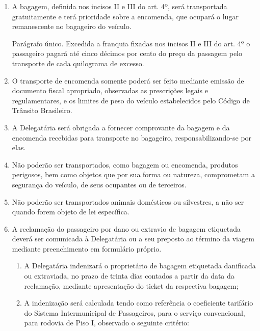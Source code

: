 \begin{enumerate}[resume, label=Art. \arabic*]

\item A bagagem, definida nos incisos II e III do art. 4º, será transportada gratuitamente e terá prioridade sobre a encomenda, que ocupará o lugar remanescente no bagageiro do veículo.

Parágrafo único. Excedida a franquia fixadas nos incisos II e III do art. 4º o passageiro pagará até cinco décimos por cento do preço da passagem pelo transporte de cada quilograma de excesso.

\item O transporte de encomenda somente poderá ser feito mediante emissão de documento fiscal apropriado, observadas as prescrições legais e regulamentares, e os limites de peso do veículo estabelecidos pelo Código de Trânsito Brasileiro.

\item A Delegatária será obrigada a fornecer comprovante da bagagem e da encomenda recebidas para transporte no bagageiro, responsabilizando-se por elas.

\item Não poderão ser transportados, como bagagem ou encomenda, produtos perigosos, bem como objetos que por sua forma ou natureza, comprometam a segurança do veículo, de seus ocupantes ou de terceiros.

\item Não poderão ser transportados animais domésticos ou silvestres, a não ser quando forem objeto de lei específica.


\item A reclamação do passageiro por dano ou extravio de bagagem etiquetada deverá ser comunicada à Delegatária ou a seu preposto ao término da viagem mediante preenchimento em formulário próprio.

\begin{enumerate}[label= \S \arabic*] %

\item A Delegatária indenizará o proprietário de bagagem etiquetada danificada ou extraviada, no prazo de trinta dias contados a partir da data da reclamação, mediante apresentação do ticket da respectiva bagagem;

\item A indenização será calculada tendo como referência o coeficiente tarifário do Sistema Intermunicipal de Passageiros, para o serviço convencional, para rodovia de Piso I, observado o seguinte critério:


\end{enumerate}
\end{enumerate}
